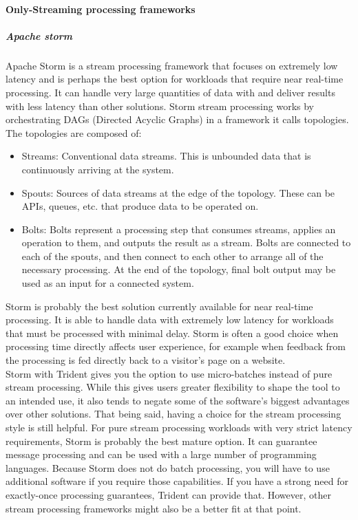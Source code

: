 \paragraph{Only-Streaming processing frameworks}
\label{sec:sec01}
\subparagraph{Apache storm}
\label{sec:sec01}
Apache Storm is a stream processing framework that focuses on extremely low latency and is perhaps the best option for workloads that require near real-time processing. It can handle very large quantities of data with and deliver results with less latency than other solutions.
Storm stream processing works by orchestrating DAGs (Directed Acyclic Graphs) in a framework it calls topologies.
The topologies are composed of:
\begin{itemize}
  \item Streams: Conventional data streams. This is unbounded data that is continuously arriving at the system.
  \item Spouts: Sources of data streams at the edge of the topology. These can be APIs, queues, etc. that produce data to be operated on.
  \item Bolts: Bolts represent a processing step that consumes streams, applies an operation to them, and outputs the result as a stream. Bolts are connected to each of the spouts, and then connect to each other to arrange all of the necessary processing. At the end of the topology, final bolt output may be used as an input for a connected system.
\end{itemize}
Storm is probably the best solution currently available for near real-time processing. It is able to handle data with extremely low latency for workloads that must be processed with minimal delay. Storm is often a good choice when processing time directly affects user experience, for example when feedback from the processing is fed directly back to a visitor's page on a website.\\
Storm with Trident gives you the option to use micro-batches instead of pure stream processing. While this gives users greater flexibility to shape the tool to an intended use, it also tends to negate some of the software's biggest advantages over other solutions. That being said, having a choice for the stream processing style is still helpful.
For pure stream processing workloads with very strict latency requirements, Storm is probably the best mature option. It can guarantee message processing and can be used with a large number of programming languages. Because Storm does not do batch processing, you will have to use additional software if you require those capabilities. If you have a strong need for exactly-once processing guarantees, Trident can provide that. However, other stream processing frameworks might also be a better fit at that point.

